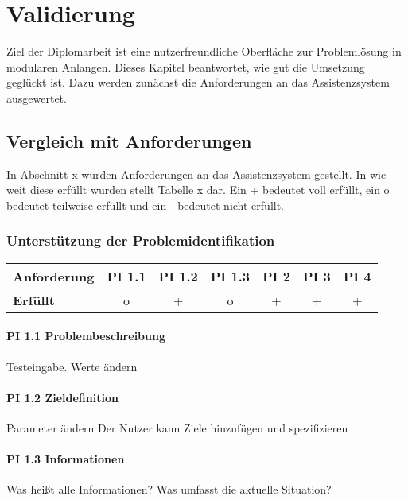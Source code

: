 \chapter{Validierung}
\label{Validierung}

Ziel der Diplomarbeit ist eine nutzerfreundliche Oberfläche zur Problemlösung in modularen Anlangen. Dieses Kapitel beantwortet, wie gut die Umsetzung geglückt ist. Dazu werden zunächst die Anforderungen an das Assistenzsystem ausgewertet. 

\section{Vergleich mit Anforderungen}
In Abschnitt x wurden Anforderungen an das Assistenzsystem gestellt. In wie weit diese erfüllt wurden stellt Tabelle x dar. Ein + bedeutet voll erfüllt, ein o bedeutet teilweise erfüllt und ein - bedeutet nicht erfüllt.

\subsection{Unterstützung der Problemidentifikation}

\begin{table}[htbp]
\centering
\begin{tabular}{l|c|c|c|c|c|c}
\textbf{Anforderung} & PI 1.1 & PI 1.2 & PI 1.3 & PI 2 & PI 3 & PI 4 \\
\hline
\textbf{Erfüllt} & o & + & o & + & + & + \\
\end{tabular}
\end{table}

\subsubsection*{PI 1.1 Problembeschreibung}
Testeingabe. Werte ändern

\subsubsection*{PI 1.2 Zieldefinition}
Parameter ändern
Der Nutzer kann Ziele hinzufügen und spezifizieren

\subsubsection*{PI 1.3 Informationen}
Was heißt alle Informationen? Was umfasst die aktuelle Situation?

